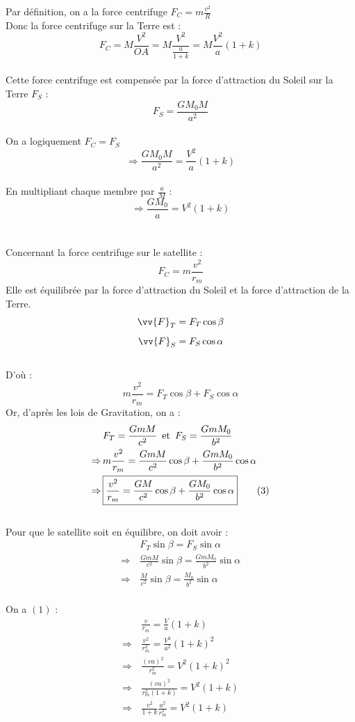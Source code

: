 \documentclass[12pt]{article}
\begin{document}
Par définition, on a la force centrifuge $F_C = m\frac{v^2}{R}$ \\
Donc la force centrifuge sur la Terre est : 
$$F_C = M\frac{V^2}{OA} = M \frac{V^2}{\frac{a}{1+k}} = M\frac{V^2}{a}(1+k)$$ \\
Cette force centrifuge est compensée par la force d'attraction du Soleil sur la Terre $F_S$ : $$ F_S = \frac{GM_0M}{a^2}$$ \\
On a logiquement $F_C = F_S$
$$\Rightarrow \frac{GM_0M}{a^2} = \frac{V^2}{a}(1+k)$$ \\
En multipliant chaque membre par $\frac{a}{M}$ : 
\begin{equation*}
\Rightarrow \boxed{\frac{GM_0}{a} = V^2(1+k)} \tag{2}
\end{equation*} \\ \\
Concernant la force centrifuge sur le satellite : 
$$F_C = m\frac{v^2}{r_m}$$
Elle est équilibrée par la force d'attraction du Soleil et la force d'attraction de la Terre. \\
$$ \vv{F}_{T} = F_T \cos \beta$$
$$ \vv{F}_{S} = F_S \cos \alpha$$\\ 
D'où : 
$$ m\frac{v^2}{r_m} = F_T \cos \beta + F_S \cos \alpha$$
Or, d'après les lois de Gravitation, on a : 
\begin{align*}
&F_T = \frac{GmM}{c^2} \text{\, et \,} F_S = \frac{GmM_0}{b^2}\\
\Rightarrow \, &m\frac{v^2}{r_m} = \frac{GmM}{c^2}\cos \beta + \frac{GmM_0}{b^2} \cos \alpha \\
\Rightarrow \, &\boxed{\frac{v^2}{r_m} = \frac{GM}{c^2} \cos \beta + \frac{GM_0}{b^2} \cos \alpha} \tag{3}
\end{align*}\\
Pour que le satellite soit en équilibre, on doit avoir : 
\begin{align*}
&F_T \sin \beta = F_S \sin \alpha \\
\Rightarrow \, &\frac{GmM}{c^2} \sin \beta = \frac{GmM_0}{b^2} \sin \alpha \\
\Rightarrow \, &\boxed{\frac{M}{c^2} \sin \beta = \frac{M_0}{b^2} \sin \alpha} \tag{4}
\end{align*}\\
On a $(1)$ : 
\begin{align*}
&\frac{v}{r_m} = \frac{V}{a}(1+k) \\
\Rightarrow \, &\frac{v^2}{r_{m}^2} = \frac{V^2}{a^2}(1+k)^2 \\
\Rightarrow \, &\frac{(va)^2}{r_{m}^2} = V^2(1+k)^2 \\
\Rightarrow \, &\frac{(va)^2}{r_m^2(1+k)} = V^2(1+k) \\
\Rightarrow \, &\frac{v^2}{1+k} \frac{a^2}{r_m^2} = V^2(1+k)
\end{align*}
\end{document}
